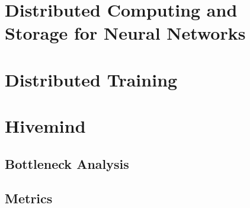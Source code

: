 \section{Distributed Computing and Storage for Neural Networks}

\section{Distributed Training}

\section{Hivemind}

\subsection{Bottleneck Analysis}

\subsection{Metrics}
